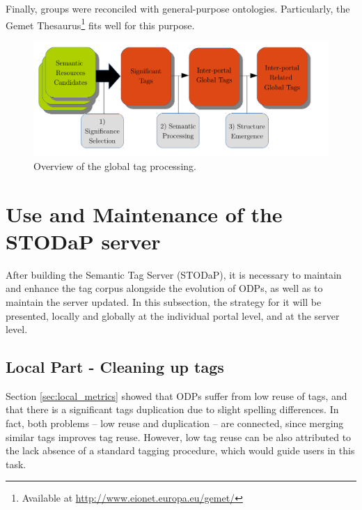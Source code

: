 Finally, groups were reconciled with general-purpose ontologies.
Particularly, the Gemet Thesaurus\footnote{Available at \url{http://www.eionet.europa.eu/gemet/}} fits well for this purpose.


\begin{figure}[tb]
\begin{center}
\includegraphics[scale=0.8]{images/global_processing.pdf}
\caption[Overview of the local tag processing.]{Overview of the global tag processing.}
\label{fig:global_processing}
\end{center}
\end{figure}

\section{Use and Maintenance of the STODaP server}
\label{sec:use_and_maintenance}



After building the Semantic Tag Server (STODaP), it is necessary to maintain and enhance the tag corpus alongside the evolution of ODPs, as well as to maintain the server updated.
In this subsection, the strategy for it will be presented, locally and globally at the individual portal level, and at the server level.


\subsection{Local Part - Cleaning up tags}
\label{sec:local}

Section \ref{sec:local_metrics} showed that ODPs suffer from low reuse of tags, and that there is a significant tags duplication due to slight spelling differences. 
In fact, both problems -- low reuse and duplication -- are connected, since merging similar tags improves tag reuse.
However, low tag reuse can be also attributed to the lack absence of a standard tagging procedure, which would guide users in this task.

